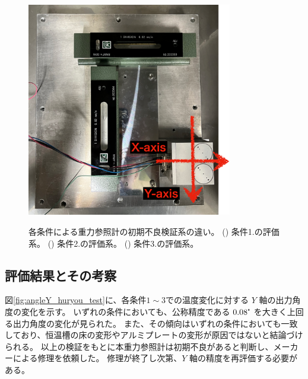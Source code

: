 \documentclass[../../main.tex]{subfiles}
\begin{document}
\begin{figure}[H]
\begin{minipage}[b]{0.42\columnwidth}
        \subcaption{}
        \label{fig:evaluation_kyoto2}
    \end{minipage}
    \begin{minipage}[b]{0.455\columnwidth}
        \centering
        \includegraphics[width=0.8\textwidth]{tiltsensor/evalu_kyoto3.pdf}
        \subcaption{}
        \label{fig:evaluation_kyoto3}
    \end{minipage}
    \caption{各条件による重力参照計の初期不良検証系の違い。
             () 条件1.の評価系。
             () 条件2.の評価系。
             () 条件3.の評価系。}
    \label{fig:evaluation_kyoto}
\end{figure}
\subsection{評価結果とその考察}
図\ref{fig:angleY_huryou_test}に、各条件$1\sim3$での温度変化に対する $Y$ 軸の出力角度の変化を示す。
いずれの条件においても、公称精度である $0.08\tcdegree$ を大きく上回る出力角度の変化が見られた。
また、その傾向はいずれの条件においても一致しており、恒温槽の床の変形やアルミプレートの変形が原因ではないと結論づけられる。
以上の検証をもとに本重力参照計は初期不良があると判断し、メーカーによる修理を依頼した。
修理が終了し次第、$Y$ 軸の精度を再評価する必要がある。
\end{document}
